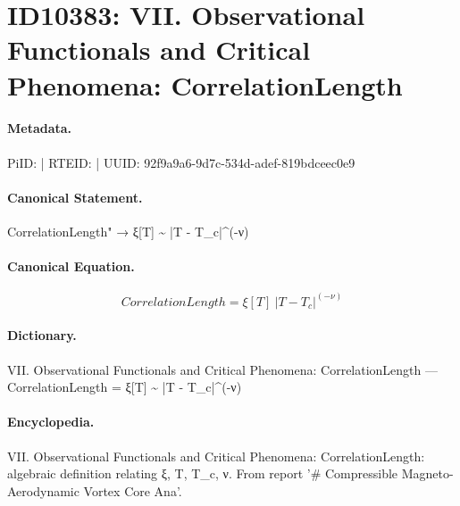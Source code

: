 \section*{ID10383: VII. Observational Functionals and Critical Phenomena: CorrelationLength}
\paragraph{Metadata.}
PiID:  | RTEID:  | UUID: 92f9a9a6-9d7c-534d-adef-819bdceec0e9

\paragraph{Canonical Statement.}
CorrelationLength" → ξ[T] \textasciitilde{} |T - T\_c|\textasciicircum{}(-ν)

\paragraph{Canonical Equation.}
\[
CorrelationLength = ξ[T] ~ |T - T_c|^(-ν)
\]

\paragraph{Dictionary.}
VII. Observational Functionals and Critical Phenomena: CorrelationLength — CorrelationLength = ξ[T] \textasciitilde{} |T - T\_c|\textasciicircum{}(-ν)

\paragraph{Encyclopedia.}
VII. Observational Functionals and Critical Phenomena: CorrelationLength: algebraic definition relating ξ, T, T\_c, ν. From report '\# Compressible Magneto-Aerodynamic Vortex Core Ana'.

